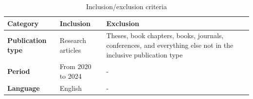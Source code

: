 \begin{table}[htbp]
	\centering
	\caption{Inclusion/exclusion criteria}
	\label{table:inclusion_exclusion_criteria}
	\renewcommand{\arraystretch}{1}  %
	\begin{tabular}{p{1.5cm}p{2.2cm}p{3.9cm}}
		\toprule
		\textbf{Category}         & \textbf{Inclusion} & \textbf{Exclusion}                                                                                             \\
		\midrule
		\textbf{Publication type} & Research articles  & Theses, book chapters, books, journals, conferences, and everything else not in the inclusive publication type \\
		\addlinespace[0.8em]
		\textbf{Period}           & From 2020 to 2024  & -                                                                                                              \\
		\addlinespace[0.8em]
		\textbf{Language}         & English            & -                                                                                                              \\
		\bottomrule
	\end{tabular}
\end{table}

